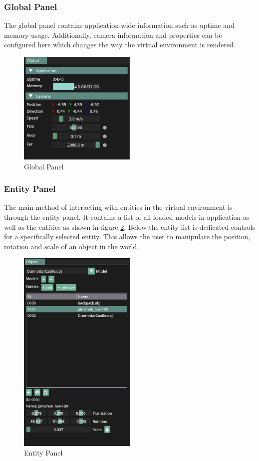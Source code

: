 \documentclass[11pt]{article}
\begin{document}
\subsubsection{Global Panel}
The global panel contains application-wide information such as uptime and memory
usage. Additionally, camera information and properties can be configured here which
changes the way the virtual environment is rendered.

\begin{figure}[H]
  \centering
  \includegraphics[width=0.5\textwidth]{images/global_panel.png}
  \caption{Global Panel}
  \label{fig:global_panel}
\end{figure}

\subsubsection{Entity Panel}
The main method of interacting with entities in the virtual environment is
through the entity panel. It contains a list of all loaded models in application
as well as the entities as shown in figure \ref{fig:entity_panel}. Below the
entity list is dedicated controls for a specifically selected entity. This
allows the user to manipulate the position, rotation and scale of an object in
the world.
\begin{figure}[H]
  \centering
  \includegraphics[width=0.5\textwidth]{images/entity_panel.png}
  \caption{Entity Panel}
  \label{fig:entity_panel}
\end{figure}
\end{document}
